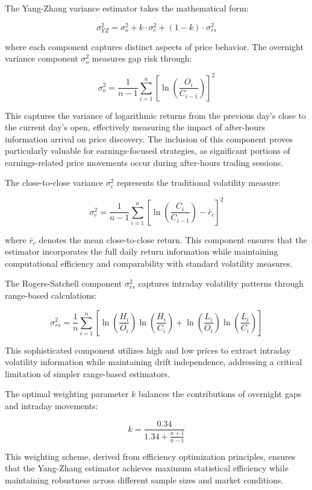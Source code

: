 \documentclass[
  american,
  11pt,
  11pt,
  letterpaper,
  onecolumn]{article}
\begin{document}
The Yang-Zhang variance estimator takes the mathematical form:

\[\sigma_{YZ}^2 = \sigma_o^2 + k \cdot \sigma_c^2 + (1-k) \cdot \sigma_{rs}^2\]

where each component captures distinct aspects of price behavior. The
overnight variance component \(\sigma_o^2\) measures gap risk through:

\[\sigma_o^2 = \frac{1}{n-1} \sum_{i=1}^{n} \left[\ln\left(\frac{O_i}{C_{i-1}}\right)\right]^2\]

This captures the variance of logarithmic returns from the previous
day's close to the current day's open, effectively measuring the impact
of after-hours information arrival on price discovery. The inclusion of
this component proves particularly valuable for earnings-focused
strategies, as significant portions of earnings-related price movements
occur during after-hours trading sessions.

The close-to-close variance \(\sigma_c^2\) represents the traditional
volatility measure:

\[\sigma_c^2 = \frac{1}{n-1} \sum_{i=1}^{n} \left[\ln\left(\frac{C_i}{C_{i-1}}\right) - \bar{r}_c\right]^2\]

where \(\bar{r}_c\) denotes the mean close-to-close return. This
component ensures that the estimator incorporates the full daily return
information while maintaining computational efficiency and comparability
with standard volatility measures.

The Rogers-Satchell component \(\sigma_{rs}^2\) captures intraday
volatility patterns through range-based calculations:

\[\sigma_{rs}^2 = \frac{1}{n} \sum_{i=1}^{n} \left[\ln\left(\frac{H_i}{O_i}\right) \ln\left(\frac{H_i}{C_i}\right) + \ln\left(\frac{L_i}{O_i}\right) \ln\left(\frac{L_i}{C_i}\right)\right]\]

This sophisticated component utilizes high and low prices to extract
intraday volatility information while maintaining drift independence,
addressing a critical limitation of simpler range-based estimators.

The optimal weighting parameter \(k\) balances the contributions of
overnight gaps and intraday movements:

\[k = \frac{0.34}{1.34 + \frac{n+1}{n-1}}\]

This weighting scheme, derived from efficiency optimization principles,
ensures that the Yang-Zhang estimator achieves maximum statistical
efficiency while maintaining robustness across different sample sizes
and market conditions.
\end{document}
